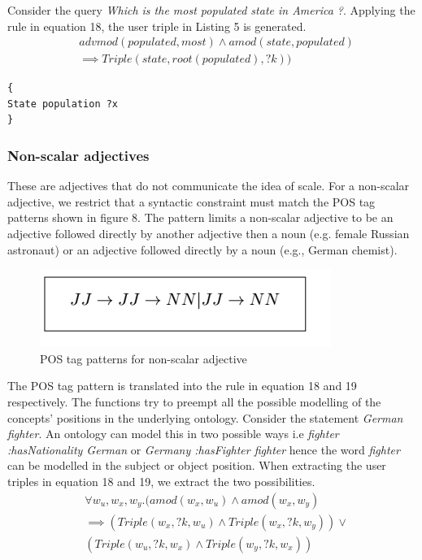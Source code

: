 \documentclass[review]{elsarticle}
\begin{document}
Consider the query \textit{Which is the most populated state in America ?}. Applying the rule in equation 18, the user  triple in Listing 5 is generated.\\
\begin{equation*}
\begin{split}
&advmod(populated,most)\land amod(state, populated)\\
& \implies Triple(state,root(populated), ?k))
\end{split}
\end{equation*}
\begin{lstlisting}[caption= User triples]
{
State population ?x
}
\end{lstlisting}
\subsubsection{Non-scalar adjectives}
These are adjectives that do not communicate the idea of scale. For a non-scalar adjective, we restrict that a syntactic constraint must match the POS tag patterns shown in figure 8. The pattern limits a non-scalar adjective to be an adjective followed directly by another adjective then a noun (e.g. female Russian astronaut) or an adjective followed directly by a noun (e.g., German chemist). 
\begin{figure}[H]	\includegraphics[scale=1.0,angle=0]{nons.png}
		\caption{POS tag patterns for non-scalar adjective  }
	\label{fig:example2}
\end{figure}
The POS tag pattern is translated into the rule in equation 18 and 19 respectively. The functions try to preempt all the possible modelling of the  concepts' positions in the  underlying ontology. Consider the statement \textit{German  fighter}. An ontology can model this in two possible ways i.e \textit{fighter :hasNationality German} or \textit{Germany :hasFighter  fighter} hence the word \textit{fighter} can be modelled in the subject or object position. When extracting the user triples in equation 18 and 19, we extract the two possibilities.
\begin{equation}
\begin{split}
 &\forall w_u,w_x,w_y.(amod(w_x,w_u)\land amod(w_x,w_y)\\
 &\implies (Triple(w_x,?k, w_u)\land Triple(w_x,?k, w_y))\lor\\ &(Triple(w_u,?k, w_x)\land Triple(w_y,?k, w_x))
 \end{split}
\end{equation}
\end{document}
